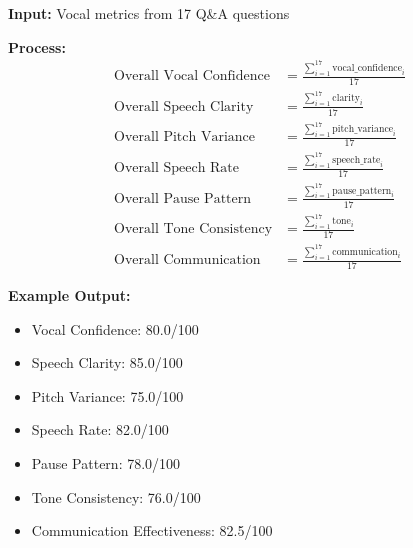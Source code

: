 \documentclass[12pt,a4paper]{article}
\begin{document}
\begin{tcolorbox}[colback=successgreen!5,colframe=successgreen,title=\textbf{STEP 2: Aggregate Vocal Metrics}]
\textbf{Input:} Vocal metrics from 17 Q\&A questions

\textbf{Process:}
\begin{align*}
\text{Overall Vocal Confidence} &= \frac{\sum_{i=1}^{17} \text{vocal\_confidence}_i}{17} \\
\text{Overall Speech Clarity} &= \frac{\sum_{i=1}^{17} \text{clarity}_i}{17} \\
\text{Overall Pitch Variance} &= \frac{\sum_{i=1}^{17} \text{pitch\_variance}_i}{17} \\
\text{Overall Speech Rate} &= \frac{\sum_{i=1}^{17} \text{speech\_rate}_i}{17} \\
\text{Overall Pause Pattern} &= \frac{\sum_{i=1}^{17} \text{pause\_pattern}_i}{17} \\
\text{Overall Tone Consistency} &= \frac{\sum_{i=1}^{17} \text{tone}_i}{17} \\
\text{Overall Communication} &= \frac{\sum_{i=1}^{17} \text{communication}_i}{17}
\end{align*}

\textbf{Example Output:}
\begin{itemize}
    \item Vocal Confidence: 80.0/100
    \item Speech Clarity: 85.0/100
    \item Pitch Variance: 75.0/100
    \item Speech Rate: 82.0/100
    \item Pause Pattern: 78.0/100
    \item Tone Consistency: 76.0/100
    \item Communication Effectiveness: 82.5/100
\end{itemize}
\end{tcolorbox}

\newpage
\end{document}
